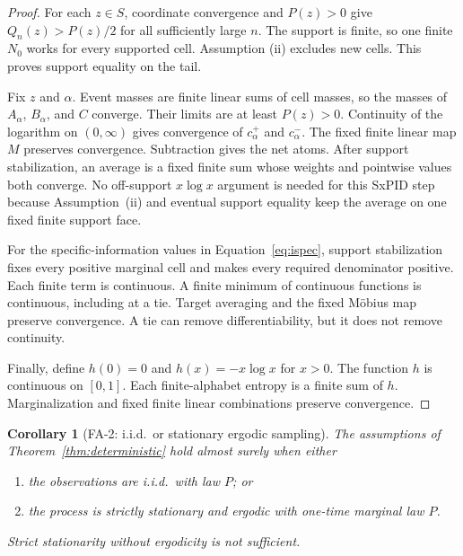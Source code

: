 \documentclass[11pt]{article}
\newtheorem{corollary}[theorem]{Corollary}
\theoremstyle{definition}
\begin{document}
\begin{proof}
For each $z\in S$, coordinate convergence and $P(z)>0$ give $Q_n(z)>P(z)/2$ for all sufficiently
large $n$.  The support is finite, so one finite $N_0$ works for every supported cell.  Assumption
(ii) excludes new cells.  This proves support equality on the tail.

Fix $z$ and $\alpha$.  Event masses are finite linear sums of cell masses, so the masses of
$A_\alpha$, $B_\alpha$, and $C$ converge.  Their limits are at least $P(z)>0$.  Continuity of the
logarithm on $(0,\infty)$ gives convergence of $c^+_\alpha$ and $c^-_\alpha$.  The fixed finite
	linear map $M$ preserves convergence.  Subtraction gives the net atoms.  After support
	stabilization, an average is a fixed finite sum whose weights and pointwise values both converge.
	No off-support $x\log x$ argument is needed for this SxPID step because Assumption~(ii) and
	eventual support equality keep the average on one fixed finite support face.

For the specific-information values in Equation~\eqref{eq:ispec}, support stabilization fixes
every positive marginal cell and makes every required denominator positive.  Each finite term is
continuous.  A finite minimum of continuous functions is continuous, including at a tie.  Target
averaging and the fixed M{\"o}bius map preserve convergence.  A tie can remove differentiability,
but it does not remove continuity.

Finally, define $h(0)=0$ and $h(x)=-x\log x$ for $x>0$.  The function $h$ is continuous on
$[0,1]$.  Each finite-alphabet entropy is a finite sum of $h$.  Marginalization and fixed finite
linear combinations preserve convergence.
\end{proof}

\begin{corollary}[FA-2: i.i.d.\ or stationary ergodic sampling]\label{cor:sampling}
The assumptions of Theorem~\ref{thm:deterministic} hold almost surely when either
\begin{enumerate}[label=(\roman*)]
  \item the observations are i.i.d.\ with law $P$; or
  \item the process is strictly stationary and ergodic with one-time marginal law $P$.
\end{enumerate}
Strict stationarity without ergodicity is not sufficient.
\end{corollary}
\end{document}
